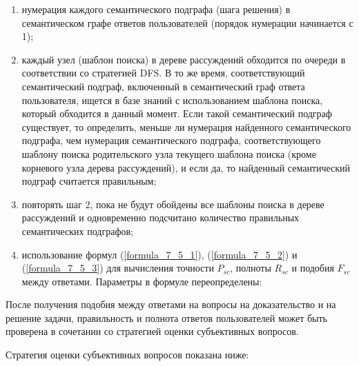 \begin{enumerate}
	\item нумерация каждого семантического подграфа (шага решения) в семантическом графе ответов пользователей (порядок нумерации начинается с 1);
	
	\item каждый узел (шаблон поиска) в дереве рассуждений обходится по очереди в соответствии со стратегией DFS. В то же время, соответствующий семантический подграф, включенный в семантический граф ответа пользователя, ищется в базе знаний с использованием шаблона поиска, который обходится в данный момент. Если такой семантический подграф существует, то определить, меньше ли нумерация найденного семантического подграфа, чем нумерация семантического подграфа, соответствующего шаблону поиска родительского узла текущего шаблона поиска (кроме корневого узла дерева рассуждений), и если да, то найденный семантический подграф считается правильным;
	
	\item повторять шаг 2, пока не будут обойдены все шаблоны поиска в дереве рассуждений и одновременно подсчитано количество правильных семантических подграфов;
	
	\item использование формул (\ref{formula_7_5_1}), (\ref{formula_7_5_2}) и (\ref{formula_7_5_3}) для вычисления точности $P_{sc}$, полноты $R_{sc}$ и подобия $F_{sc}$ между ответами. Параметры в формуле переопределены:
	
	
\end{enumerate}

После получения подобия между ответами на вопросы на доказательство и на решение задачи, правильность и полнота ответов пользователей может быть проверена в сочетании со стратегией оценки субъективных вопросов.

Стратегия оценки субъективных вопросов показана ниже:


